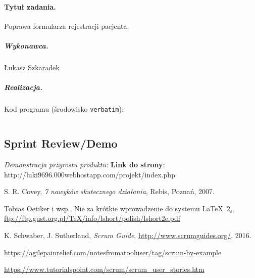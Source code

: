 \documentclass[a4paper]{article} \usepackage{polski} \usepackage[cp1250]{inputenc} \usepackage{url}
\begin{document}
\paragraph{Tytuł zadania.}  Poprawa formularza rejestracji pacjenta.  \subparagraph{Wykonawca.} Łukasz Szkaradek\subparagraph{Realizacja.}  
\newline
\newline
Kod programu (środowisko \texttt{verbatim}): \begin{verbatim} \end{verbatim}






\subsection{Sprint Review/Demo}\label{Sprint4demo}
\newline
\newline
\textit{Demonstracja przyrostu produktu:}\newline
\newline
\textbf{Link do strony}: http://luki9696.000webhostapp.com/projekt/index.php


\begin{thebibliography}{9}

 S. R. Covey, {\em 7 nawyków skutecznego działania}, Rebis, Poznań, 2007.

 Tobias Oetiker i wsp., Nie za krótkie wprowadzenie do systemu \LaTeX \ $2_\varepsilon$, \url{ftp://ftp.gust.org.pl/TeX/info/lshort/polish/lshort2e.pdf}

 K. Schwaber, J. Sutherland, {\em Scrum Guide}, \url{http://www.scrumguides.org/}, 2016.

 \url{https://agilepainrelief.com/notesfromatooluser/tag/scrum-by-example}

 \url{https://www.tutorialspoint.com/scrum/scrum_user_stories.htm}

\end{thebibliography}
\end{document}
